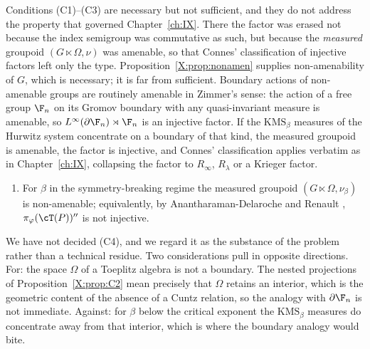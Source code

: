 \begin{remark}\label{X:rem:omitted}
Conditions (C1)--(C3) are necessary but not sufficient, and they do not address the property
that governed Chapter~\ref{ch:IX}. There the factor was erased not because the index semigroup was
commutative as such, but because the \emph{measured} groupoid $(G\ltimes\Omega,\nu)$ was
amenable, so that Connes' classification of injective factors left only the type.
Proposition~\ref{X:prop:nonamen} supplies non-amenability of $G$, which is necessary; it is far
from sufficient. Boundary actions of non-amenable groups are routinely amenable in Zimmer's
sense: the action of a free group $\F_n$ on its Gromov boundary with any quasi-invariant
measure is amenable, so $L^\infty(\partial\F_n)\rtimes\F_n$ is an injective factor. If the
$\mathrm{KMS}_\beta$ measures of the Hurwitz system concentrate on a boundary of that kind,
the measured groupoid is amenable, the factor is injective, and Connes' classification
applies verbatim as in Chapter~\ref{ch:IX}, collapsing the factor to $R_\infty$, $R_\lambda$ or a
Krieger factor.
\end{remark}

\begin{definition}\label{X:def:C4}
\begin{enumerate}
\item[(C4)] For $\beta$ in the symmetry-breaking regime the measured groupoid
$(G\ltimes\Omega,\nu_\beta)$ is non-amenable; equivalently, by Anantharaman-Delaroche and
Renault \cite{ADR}, $\pi_\varphi(\cT(P))''$ is not injective.
\end{enumerate}
\end{definition}

\begin{remark}\label{X:rem:status}
We have not decided (C4), and we regard it as the substance of the problem rather than a
technical residue. Two considerations pull in opposite directions. For: the space $\Omega$ of
a Toeplitz algebra is not a boundary. The nested projections of Proposition~\ref{X:prop:C2}
mean precisely that $\Omega$ retains an interior, which is the geometric content of the
absence of a Cuntz relation, so the analogy with $\partial\F_n$ is not immediate. Against:
for $\beta$ below the critical exponent the $\mathrm{KMS}_\beta$ measures do concentrate away
from that interior, which is where the boundary analogy would bite.
\end{remark}

